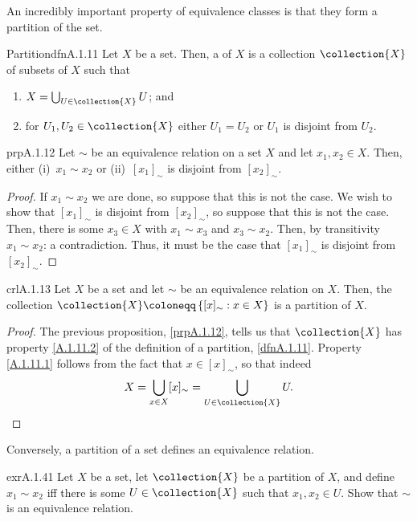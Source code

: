 An incredibly important property of equivalence classes is that they form a partition of the set.
\begin{dfn}{Partition}{dfnA.1.11}
Let $X$ be a set.  Then, a  of $X$ is a collection $\collection{X}$ of subsets of $X$ such that
\begin{enumerate}
\item \label{A.1.11.1}$X=\bigcup _{U\in \collection{X}}U$; and
\item \label{A.1.11.2}for $U_1,U_2\in \collection{X}$ either $U_1=U_2$ or $U_1$ is disjoint from $U_2$.
\end{enumerate}
\end{dfn}
\begin{prp}{}{prpA.1.12}
Let $\sim$ be an equivalence relation on a set $X$ and let $x_1,x_2\in X$.  Then, either (i)~$x_1\sim x_2$ or (ii)~$[x_1]_\sim$ is disjoint from $[x_2]_\sim$.
\begin{proof}
If $x_1\sim x_2$ we are done, so suppose that this is not the case.  We wish to show that $[x_1]_\sim$ is disjoint from $[x_2]_\sim$, so suppose that this is not the case.  Then, there is some $x_3\in X$ with $x_1\sim x_3$ and $x_3\sim x_2$.  Then, by transitivity $x_1\sim x_2$:  a contradiction.  Thus, it must be the case that $[x_1]_\sim$ is disjoint from $[x_2]_\sim$.
\end{proof}
\end{prp}
\begin{crl}{}{crlA.1.13}
Let $X$ be a set and let $\sim$ be an equivalence relation on $X$.  Then, the collection $\collection{X}\coloneqq \left\{ [x]_\sim :x\in X\right\}$ is a partition of $X$.
\begin{proof}
The previous proposition, \cref{prpA.1.12}, tells us that $\collection{X}$ has property \cref{A.1.11.2} of the definition of a partition, \cref{dfnA.1.11}.  Property \cref{A.1.11.1} follows from the fact that $x\in [x]_\sim$, so that indeed
\begin{equation}
X=\bigcup _{x\in X}[x]_\sim =\bigcup _{U\in \collection{X}}U.
\end{equation}
\end{proof}
\end{crl}
Conversely, a partition of a set defines an equivalence relation.
\begin{exr}{}{exrA.1.41}
Let $X$ be a set, let $\collection{X}$ be a partition of $X$, and define $x_1\sim x_2$ iff there is some $U\in \collection{X}$ such that $x_1,x_2\in U$.  Show that $\sim$ is an equivalence relation.
\end{exr}
